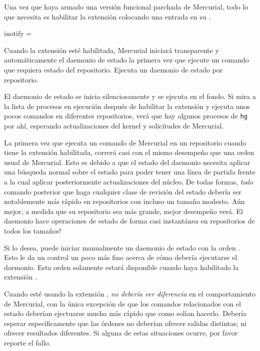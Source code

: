 Una vez que haya armado una versión funcional parchada de Mercurial,
todo lo que necesita es habilitar la extensión 
colocando una entrada en su \hgrc.
\begin{codesample2}
  [extensions]
  inotify =
\end{codesample2}
Cuando la extensión  esté habilitada, Mercurial
iniciará transparente y automáticamente el daemonio de estado la
primera vez que ejecute un comando que requiera estado del
repositorio.  Ejecuta un daemonio de estado por repositorio.

El daemonio de estado se inicia silenciosamente y se ejecuta en el
fondo. Si mira a la lista de procesos en ejecución después de
habilitar la extensión  y ejecuta unos pocos comandos
en diferentes repositorios, verá que hay algunos procesos de
\texttt{hg} por ahí, esperando actualizaciones del kernel y
solicitudes de Mercurial.

La primera vez que ejecuta un comando de Mercurial en un repositorio
cuando tiene la extensión  habilitada, correrá casi con
el mismo desempeño que una orden usual de Mercurial.  Esto es debido a
que el estado del daemonio necesita aplicar una búsqueda normal sobre
el estado para poder tener una línea de partida frente a la cual
aplicar posteriormente actualizaciones del núcleo.  De todas formas,
\emph{todo} comando posterior que haga cualquier clase de revisión del
estado debería ser notablemente más rápido en repositorios con incluso
un tamaño modesto.  Aún mejor, a medida que su repositorio sea más
grande, mejor desempeño verá.  El daemonio  hace
operaciones de estado de forma casi instantánea en repositorios de
todos los tamaños!

Si lo desea, puede iniciar manualmente un daemonio de estado con la orden
.  Esto le da un control un poco más fino
acerca de cómo debería ejecutarse el daemonio.  Esta orden solamente
estará disponible cuando haya habilitado la extensión .

Cuando esté usando la extensión ,
\emph{no debería ver diferencia} en el comportamiento de Mercurial,
con la única excepción de que los comandos relacionados con el estado
deberían ejectuarse mucho más rápido que como solían hacerlo.  Debería
esperar específicamente que las órdenes no deberían ofrecer salidas
distintas; ni ofrecer resultados diferentes.  Si alguna de estas
situaciones ocurre, por favor reporte el fallo.

